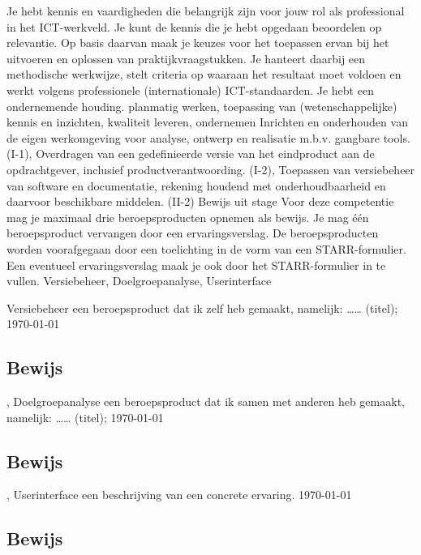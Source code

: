 
\competentie
{%
	\competentieformulier
	{%
		Je hebt kennis en vaardigheden die belangrijk zijn voor jouw rol als professional in het ICT-werkveld. Je kunt de kennis die je hebt opgedaan beoordelen op relevantie. Op basis daarvan maak je keuzes voor het toepassen ervan bij het uitvoeren en oplossen van praktijkvraagstukken. Je hanteert daarbij een methodische werkwijze, stelt criteria op waaraan het resultaat moet voldoen en werkt volgens professionele (internationale) ICT-standaarden. Je hebt een ondernemende houding.
	}
	{%
		planmatig werken,%
		toepassing van (wetenschappelijke) kennis en inzichten,%
		kwaliteit leveren,%
		ondernemen%
	}
	{%
		{Inrichten en onderhouden van de eigen werkomgeving voor analyse, ontwerp en realisatie m.b.v. gangbare tools. (I-1)},%
		{Overdragen van een gedefinieerde versie van het eindproduct aan de opdrachtgever, inclusief productverantwoording. (I-2)},%
		{Toepassen van versiebeheer van software en documentatie, rekening houdend met onderhoudbaarheid en daarvoor beschikbare middelen. (II-2)}
	}
	{%
		Bewijs uit stage
	}
	{%
		Voor deze competentie mag je maximaal drie beroepsproducten opnemen als bewijs. Je mag één beroepsproduct vervangen door een ervaringsverslag. De beroepsproducten worden voorafgegaan door een toelichting in de vorm van een STARR-formulier. Een eventueel ervaringsverslag maak je ook door het STARR-formulier in te vullen.
	}
	{%
		Versiebeheer,%
		Doelgroepanalyse,%
		Userinterface%
	}
}
{%
	\bewijs
	{%
		Versiebeheer
	}
	{%
		\starr
		{%
			een beroepsproduct dat ik zelf heb gemaakt, namelijk: …… (titel);
		}
		{%
			\today
		}
		{%
			\lipsum[1]
		}
		{%
			\lipsum[2]
		}
		{%
			\lipsum[3]
		}
		{%
			\lipsum[4]
		}
		{%
			\lipsum[5]
		}
	}
	{%
		\subsection*{Bewijs}
		\lipsum
	},
	\bewijs
	{%
		Doelgroepanalyse
	}
	{%
		\starr
		{%
			een beroepsproduct dat ik samen met anderen heb gemaakt, namelijk: …… (titel);
		}
		{%
			\today
		}
		{%
			\lipsum[6]
		}
		{%
			\lipsum[7]
		}
		{%
			\lipsum[8]
		}
		{%
			\lipsum[9]
		}
		{%
			\lipsum[10]
		}
	}
	{%
		\subsection*{Bewijs}
		\lipsum
	},
	\bewijs
	{%
		Userinterface
	}
	{%
		\starr
		{%
			een beschrijving van een concrete ervaring.
		}
		{%
			\today
		}
		{%
			\lipsum[11]
		}
		{%
			\lipsum[12]
		}
		{%
			\lipsum[13]
		}
		{%
			\lipsum[14]
		}
		{%
			\lipsum[15]
		}
	}
	{%
		\subsection*{Bewijs}
		\lipsum
	}
}
